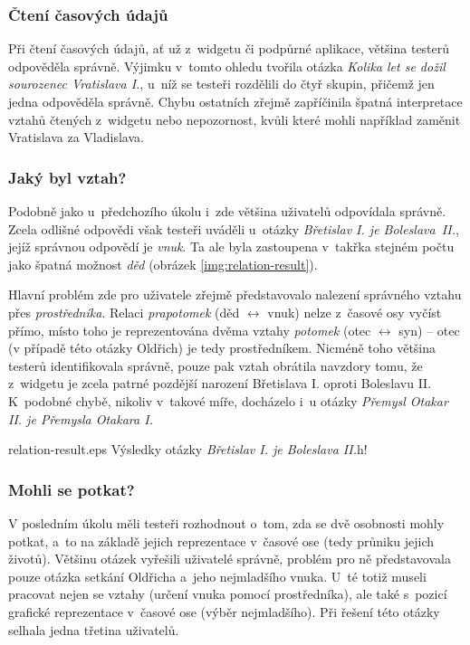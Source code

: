 		\subsubsection{Čtení časových údajů}
		Při čtení časových údajů, ať už z~widgetu či podpůrné aplikace, většina testerů odpověděla správně. Výjimku v~tomto ohledu tvořila otázka \emph{Kolika let se dožil sourozenec Vratislava I.}, u~níž se testeři rozdělili do čtyř skupin, přičemž jen jedna odpověděla správně. Chybu ostatních zřejmě zapříčinila špatná interpretace vztahů čtených z~widgetu nebo nepozornost, kvůli které mohli například zaměnit Vratislava za Vladislava.
		
		\subsubsection{Jaký byl vztah?}
		Podobně jako u~předchozího úkolu i~zde většina uživatelů odpovídala správně. Zcela odlišné odpovědi však testeři uváděli u~otázky \emph{Břetislav I. je \underline{\qquad} Boleslava~II.}, jejíž správnou odpovědí je \emph{vnuk}. Ta ale byla zastoupena v~takřka stejném počtu jako špatná možnost \emph{děd} (obrázek \ref{img:relation-result}).
		
		Hlavní problém zde pro uživatele zřejmě představovalo nalezení správného vztahu přes \emph{prostředníka}. Relaci \emph{prapotomek} (děd $\leftrightarrow$ vnuk) nelze z~časové osy vyčíst přímo, místo toho je reprezentována dvěma vztahy \emph{potomek} (otec $\leftrightarrow$ syn) -- otec (v případě této otázky Oldřich) je tedy prostředníkem. Nicméně toho většina testerů identifikovala správně, pouze pak vztah obrátila navzdory tomu, že z~widgetu je zcela patrné pozdější narození Břetislava I. oproti Boleslavu II. K~podobné chybě, nikoliv v~takové míře, docházelo i~u otázky \emph{Přemysl Otakar II. je \underline{\qquad} Přemysla Otakara I.}
		
		{}{relation-result.eps}
		{Výsledky otázky \emph{Břetislav I. je \underline{\qquad} Boleslava II.}}{h!}
		
		\subsubsection{Mohli se potkat?}
		V posledním úkolu měli testeři rozhodnout o~tom, zda se dvě osobnosti mohly potkat, a~to na základě jejich reprezentace v~časové ose (tedy průniku jejich životů). Většinu otázek vyřešili uživatelé správně, problém pro ně představovala pouze otázka setkání Oldřicha a~jeho nejmladšího vnuka. U~té totiž museli pracovat nejen se vztahy (určení vnuka pomocí prostředníka), ale také s~pozicí grafické reprezentace v~časové ose (výběr nejmladšího). Při řešení této otázky selhala jedna třetina uživatelů.
		
